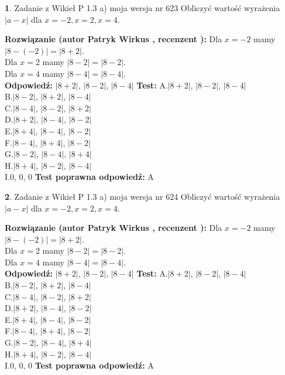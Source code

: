 \documentclass[12pt, a4paper]{article}
\theoremstyle{definition} %
\newtheorem{zad}{}
\newcommand{\zadStart}[1]{\begin{zad}#1\newline}
\newcommand{\zadStop}{\end{zad}}
\newcommand{\rozwStart}[2]{\noindent \textbf{Rozwiązanie (autor #1 , recenzent #2): }\newline}
\newcommand{\rozwStop}{\newline}
\newcommand{\odpStart}{\noindent \textbf{Odpowiedź:}\newline}
\newcommand{\odpStop}{\newline}
\newcommand{\testStart}{\noindent \textbf{Test:}\newline}
\newcommand{\testStop}{\newline}
\newcommand{\kluczStart}{\noindent \textbf{Test poprawna odpowiedź:}\newline}
\newcommand{\kluczStop}{\newline}
\begin{document}
\zadStart{Zadanie z Wikieł P 1.3 a) moja wersja nr 623}
Obliczyć wartość wyrażenia $|a - x|$ dla $x=-2,x=2,x=4$.
\zadStop
\rozwStart{Patryk Wirkus}{}
Dla $x = -2$ mamy $|8 - (-2)| = |8 + 2|$.\\
Dla $x = 2$ mamy $|8 - 2| = |8 - 2|$.\\
Dla $x = 4$ mamy $|8 - 4| = |8 - 4|$.\\
\rozwStop
\odpStart
$|8 + 2|$, $|8 - 2|$, $|8 - 4|$
\odpStop
\testStart
A.$|8 + 2|$, $|8 - 2|$, $|8 - 4|$\\
B.$|8 - 2|$, $|8 + 2|$, $|8 - 4|$\\
C.$|8 - 4|$, $|8 - 2|$, $|8 + 2|$\\
D.$|8 + 2|$, $|8 - 4|$, $|8 - 2|$\\
E.$|8 + 4|$, $|8 - 4|$, $|8 - 2|$\\
F.$|8 - 4|$, $|8 + 4|$, $|8 - 2|$\\
G.$|8 - 2|$, $|8 - 4|$, $|8 + 4|$\\
H.$|8 + 4|$, $|8 - 2|$, $|8 - 4|$\\
I.$0$, $0$, $0$
\testStop
\kluczStart
A
\kluczStop



\zadStart{Zadanie z Wikieł P 1.3 a) moja wersja nr 624}
Obliczyć wartość wyrażenia $|a - x|$ dla $x=-2,x=2,x=4$.
\zadStop
\rozwStart{Patryk Wirkus}{}
Dla $x = -2$ mamy $|8 - (-2)| = |8 + 2|$.\\
Dla $x = 2$ mamy $|8 - 2| = |8 - 2|$.\\
Dla $x = 4$ mamy $|8 - 4| = |8 - 4|$.\\
\rozwStop
\odpStart
$|8 + 2|$, $|8 - 2|$, $|8 - 4|$
\odpStop
\testStart
A.$|8 + 2|$, $|8 - 2|$, $|8 - 4|$\\
B.$|8 - 2|$, $|8 + 2|$, $|8 - 4|$\\
C.$|8 - 4|$, $|8 - 2|$, $|8 + 2|$\\
D.$|8 + 2|$, $|8 - 4|$, $|8 - 2|$\\
E.$|8 + 4|$, $|8 - 4|$, $|8 - 2|$\\
F.$|8 - 4|$, $|8 + 4|$, $|8 - 2|$\\
G.$|8 - 2|$, $|8 - 4|$, $|8 + 4|$\\
H.$|8 + 4|$, $|8 - 2|$, $|8 - 4|$\\
I.$0$, $0$, $0$
\testStop
\kluczStart
A
\kluczStop
\end{document}

